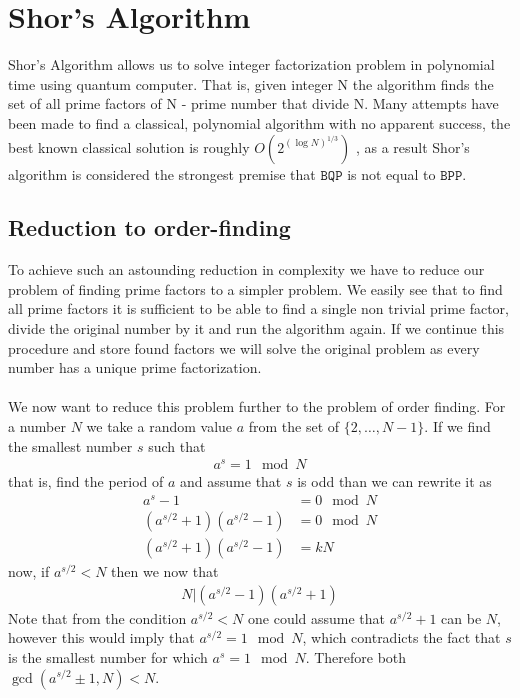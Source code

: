 \section{Shor's Algorithm}
Shor's Algorithm allows us to solve integer factorization problem in polynomial time using quantum computer. That is, given integer N the algorithm finds the set of all prime factors of N - prime number that divide N. Many attempts have been made to find a classical, polynomial algorithm with no apparent success, the best known classical solution is roughly $O(2^{(\log N)^{1/3}})$ \cite{thebook}, as a result Shor's algorithm is considered the strongest premise that $\mathtt{BQP}$ is not equal to $\mathtt{BPP}$.
\subsection{Reduction to order-finding}
To achieve such an astounding reduction in complexity we have to reduce our problem of finding prime factors to a simpler problem. We easily see that to find all prime factors it is sufficient to be able to find a single non trivial prime factor, divide the original number by it and run the algorithm again. If we continue this procedure and store found factors we will solve the original problem as every number has a unique prime factorization.
\\\\
We now want to reduce this problem further to the problem of order finding. For a number $N$ we take a random value $a$ from the set of $\{2,\dots,N-1\}$. If we find the smallest number $s$ such that
\begin{align*}
    a^s=1\mod{N}
\end{align*}
that is, find the period of $a$ and assume that $s$ is odd than we can rewrite it as
\begin{align*}
    a^s-1&=0 \mod{N}\\
    (a^{s/2}+1)(a^{s/2}-1)&=0 \mod{N}\\
    (a^{s/2}+1)(a^{s/2}-1)&=kN
\end{align*}
now, if $a^{s/2}<N$ then we now that
\begin{align*}
    N|(a^{s/2}-1)(a^{s/2}+1)
\end{align*}
Note that from the condition $a^{s/2}<N$ one could assume that $a^{s/2}+1$ can be $N$, however this would imply that $a^{s/2}=1 \mod{N}$, which contradicts the fact that $s$ is the smallest number for which $a^{s}=1 \mod{N}$. Therefore both $\gcd(a^{s/2}\pm 1,N)<N$.
\\\\
